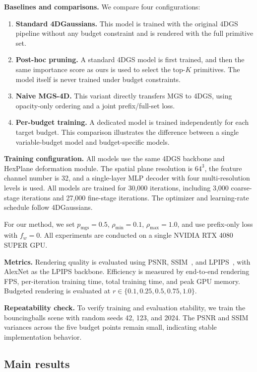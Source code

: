 \documentclass[pdflatex,sn-mathphys]{sn-jnl}
\begin{document}
\textbf{Baselines and comparisons.} We compare four configurations:

\begin{enumerate}
    \item \textbf{Standard 4DGaussians.} This model is trained with the original 4DGS pipeline without any budget constraint and is rendered with the full primitive set.
    \item \textbf{Post-hoc pruning.} A standard 4DGS model is first trained, and then the same importance score as ours is used to select the top-$K$ primitives. The model itself is never trained under budget constraints.
    \item \textbf{Naive MGS-4D.} This variant directly transfers MGS to 4DGS, using opacity-only ordering and a joint prefix/full-set loss.
    \item \textbf{Per-budget training.} A dedicated model is trained independently for each target budget. This comparison illustrates the difference between a single variable-budget model and budget-specific models.
\end{enumerate}

\textbf{Training configuration.} All models use the same 4DGS backbone and HexPlane deformation module. The spatial plane resolution is $64^3$, the feature channel number is 32, and a single-layer MLP decoder with four multi-resolution levels is used. All models are trained for 30,000 iterations, including 3,000 coarse-stage iterations and 27,000 fine-stage iterations. The optimizer and learning-rate schedule follow 4DGaussians.

For our method, we set $p_{\mathrm{mgs}}=0.5$, $\rho_{\min}=0.1$, $\rho_{\max}=1.0$, and use prefix-only loss with $f_w=0$. All experiments are conducted on a single NVIDIA RTX 4080 SUPER GPU.

\textbf{Metrics.} Rendering quality is evaluated using PSNR, SSIM~\cite{wang2004ssim}, and LPIPS~\cite{zhang2018lpips}, with AlexNet as the LPIPS backbone. Efficiency is measured by end-to-end rendering FPS, per-iteration training time, total training time, and peak GPU memory. Budgeted rendering is evaluated at $r \in \{0.1,0.25,0.5,0.75,1.0\}$.

\textbf{Repeatability check.} To verify training and evaluation stability, we train the bouncingballs scene with random seeds 42, 123, and 2024. The PSNR and SSIM variances across the five budget points remain small, indicating stable implementation behavior.

\subsection{Main results}
\label{sec:main}
\end{document}
